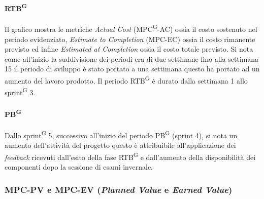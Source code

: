 \documentclass[5pt]{article}
\begin{document}
	\paragraph{RTB\textsuperscript{G}} Il grafico mostra le metriche \textit{Actual Cost} (MPC\textsuperscript{G}-AC)  ossia il costo sostenuto nel periodo evidenziato, \textit{Estimate to Completion} (MPC-EC) ossia il costo rimanente previsto ed infine \textit{Estimated at Completion} ossia il costo totale previsto. 
	Si nota come all'inizio la suddivisione dei periodi era di due settimane fino alla settimana 15 il periodo di sviluppo è stato portato a una settimana questo ha portato ad un aumento del lavoro prodotto. 
	Il periodo RTB\textsuperscript{G} è durato dalla settimana 1 allo sprint\textsuperscript{G} 3.
	
	\paragraph{PB\textsuperscript{G}} Dallo sprint\textsuperscript{G} 5, successivo all'inizio del periodo PB\textsuperscript{G} (sprint 4), si nota un aumento dell'attività del progetto questo è attribuibile all'applicazione dei \textit{feedback} ricevuti dall'esito della fase RTB\textsuperscript{G} e dall'aumento della disponibilità dei componenti dopo la sessione di esami invernale.
	
	\subsubsection{MPC-PV e MPC-EV (\textit{Planned Value} e \textit{Earned Value})}
	
\end{document}
